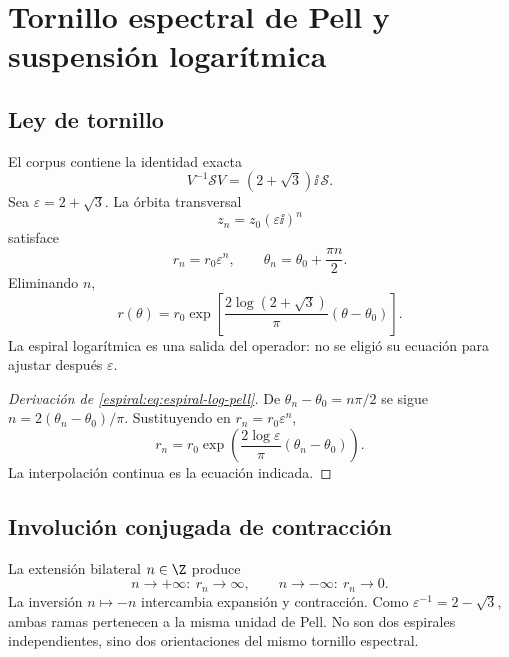 
\chapter{Tornillo espectral de Pell y suspensión logarítmica}

\section{Ley de tornillo}

El corpus contiene la identidad exacta
\begin{equation}
 V^{-1}\mathscr S V=(2+\sqrt3)\ii\,\mathscr S.
 \label{espiral:eq:tornillo-pell}
\end{equation}
Sea \(\varepsilon=2+\sqrt3\). La órbita transversal
\[
 z_n=z_0(\varepsilon\ii)^n
\]
satisface
\[
 r_n=r_0\varepsilon^n,
 \qquad
 \theta_n=\theta_0+\frac{\pi n}{2}.
\]
Eliminando \(n\),
\begin{equation}
 r(\theta)=r_0
 \exp\!\left[
 \frac{2\log(2+\sqrt3)}{\pi}
 (\theta-\theta_0)
 \right].
 \label{espiral:eq:espiral-log-pell}
\end{equation}
La espiral logarítmica es una salida del operador: no se eligió su ecuación
para ajustar después \(\varepsilon\).

\begin{proof}[Derivación de \cref{espiral:eq:espiral-log-pell}]
De \(\theta_n-\theta_0=n\pi/2\) se sigue
\(n=2(\theta_n-\theta_0)/\pi\). Sustituyendo en
\(r_n=r_0\varepsilon^n\),
\[
 r_n=r_0\exp\left(
 \frac{2\log\varepsilon}{\pi}(\theta_n-\theta_0)
 \right).
\]
La interpolación continua es la ecuación indicada.
\end{proof}

\section{Involución conjugada de contracción}

La extensión bilateral \(n\in\Z\) produce
\[
 n\to+\infty:\ r_n\to\infty,
 \qquad
 n\to-\infty:\ r_n\to0.
\]
La inversión \(n\mapsto-n\) intercambia expansión y contracción. Como
\(\varepsilon^{-1}=2-\sqrt3\), ambas ramas pertenecen a la misma unidad de
Pell. No son dos espirales independientes, sino dos orientaciones del mismo
tornillo espectral.

